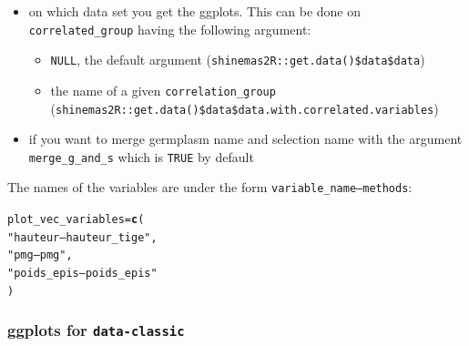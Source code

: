 \documentclass{article}\usepackage[]{graphicx}\usepackage[]{color}
\makeatletter
\newcommand{\hlstr}[1]{\textcolor[rgb]{0.192,0.494,0.8}{#1}}%
\newcommand{\hlstd}[1]{\textcolor[rgb]{0.345,0.345,0.345}{#1}}%
\newcommand{\hlkwb}[1]{\textcolor[rgb]{0.69,0.353,0.396}{#1}}%
\newcommand{\hlkwd}[1]{\textcolor[rgb]{0.737,0.353,0.396}{\textbf{#1}}}%
\newenvironment{kframe}{%
 \def\at@end@of@kframe{}%
 \ifinner\ifhmode%
  \def\at@end@of@kframe{\end{minipage}}%
  \begin{minipage}{\columnwidth}%
 \fi\fi%
 \def\FrameCommand##1{\hskip\@totalleftmargin \hskip-\fboxsep
 \colorbox{shadecolor}{##1}\hskip-\fboxsep
     \hskip-\linewidth \hskip-\@totalleftmargin \hskip\columnwidth}%
 \MakeFramed {\advance\hsize-\width
   \@totalleftmargin\z@ \linewidth\hsize
   \@setminipage}}%
 {\par\unskip\endMakeFramed%
 \at@end@of@kframe}
\newenvironment{knitrout}{}{} %
\makeatother
\begin{document}
\begin{itemize}
\item on which data set you get the ggplots.
This can be done on \texttt{correlated\_group} having the following argument:
\begin{itemize}
\item \texttt{NULL}, the default argument (\texttt{shinemas2R::get.data()\$data\$data})
\item the name of a given \texttt{correlation\_group} (\texttt{shinemas2R::get.data()\$data\$data.with.correlated.variables})
\end{itemize}

\item if you want to merge germplasm name and selection name with the argument \texttt{merge\_g\_and\_s} which is \texttt{TRUE} by default
\end{itemize}


The names of the variables are under the form \texttt{variable\_name---methods}:
\begin{knitrout}
\color{fgcolor}\begin{kframe}
\begin{alltt}
\hlstd{plot_vec_variables} \hlkwb{=} \hlkwd{c}\hlstd{(}
        \hlstr{"hauteur---hauteur_tige"}\hlstd{,}
        \hlstr{"pmg---pmg"}\hlstd{,}
        \hlstr{"poids_epis---poids_epis"}
        \hlstd{)}
\end{alltt}
\end{kframe}
\end{knitrout}

\subsubsection{ggplots for \texttt{data-classic} }
\end{document}
